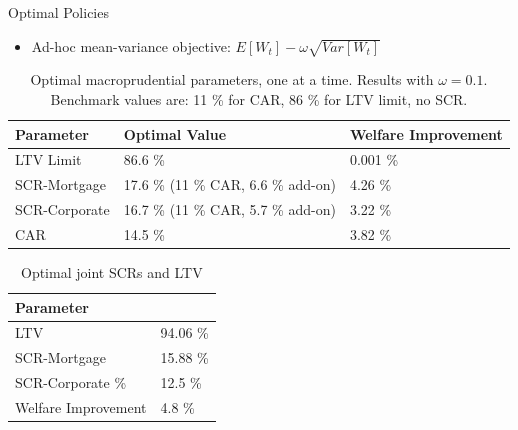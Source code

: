 \documentclass[8pt,aspectratio=169]{beamer}
\numberwithin{equation}{section}
\begin{document}
\begin{frame}{Optimal Policies}

\begin{itemize}
\item Ad-hoc mean-variance objective: $  E[W_t] - \omega \sqrt{Var[W_t]}  $
\end{itemize}


\pause 
\begin{table}[h]

\caption{Optimal macroprudential parameters, one at a time. Results with $\omega=0.1$. 
Benchmark values are: 11 \% for CAR, 86 \% for LTV limit, no SCR. }
\begin{tabular}{l|l|l}

 \hline
 \hline
Parameter   &  Optimal Value & Welfare Improvement \\
\hline
\hline
LTV Limit&    86.6 \%  & 0.001 \%  \\

SCR-Mortgage &    17.6 \% (11 \% CAR, 6.6 \% add-on) & 4.26 \% \\

SCR-Corporate &    16.7 \% (11 \% CAR, 5.7 \% add-on) & 3.22 \% \\

CAR &    14.5 \% & 3.82 \% \\


\end{tabular}
\end{table}

\pause

\begin{table}[h]

\caption{Optimal joint SCRs and LTV}
\begin{tabular}{l|l}

 \hline
 \hline
Parameter  &  \\
\hline
\hline
LTV &    94.06 \%  \\

SCR-Mortgage      & 15.88 \%  \\

SCR-Corporate \%  & 12.5 \%  \\

Welfare Improvement  & 4.8 \% \\


\end{tabular}
\end{table}
\end{frame}
\end{document}
